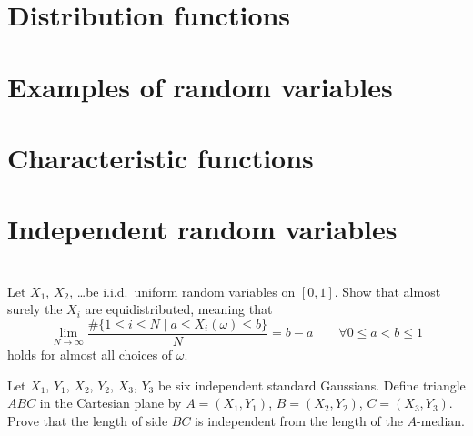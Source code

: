 \section{Distribution functions}

\section{Examples of random variables}

\section{Characteristic functions}

\section{Independent random variables}

\section{\problemhead}
\begin{problem}
	[Equidistribution]
	Let $X_1$, $X_2$, \dots be i.i.d.\ uniform random variables on $[0,1]$.
	Show that almost surely the $X_i$ are equidistributed,
	meaning that
	\[ \lim_{N \to \infty} \frac{ \# \{1 \le i \le N \mid a \le X_i(\omega) \le b \}}{N}
		= b-a \qquad \forall 0 \le a < b \le 1 \]
	holds for almost all choices of $\omega$.
\end{problem}

\begin{problem}
	Let $X_1$, $Y_1$, $X_2$, $Y_2$, $X_3$, $Y_3$
	be six independent standard Gaussians.
	Define triangle $ABC$ in the Cartesian plane
	by $A = (X_1,Y_1)$, $B = (X_2,Y_2)$, $C = (X_3,Y_3)$.
	Prove that the length of side $BC$
	is independent from the length of the $A$-median.
\end{problem}

